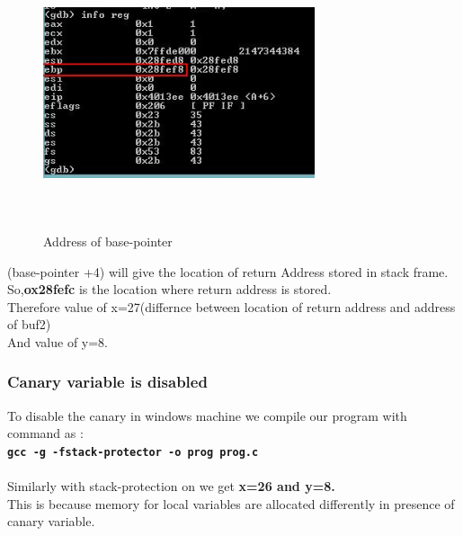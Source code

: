 \documentclass{article}
\begin{document}
      \begin{figure}[H]
           \begin{center}
		\includegraphics[width=8cm,height=8cm]{infoReg.JPG}
	\caption{Address of base-pointer}
	\end{center}
	\end{figure}
     
     (base-pointer +4) will give the location of return Address stored in stack frame.\\
     So,\textbf{ox28fefc} is the location where return address is stored.\\
     Therefore value of x=27(differnce between location of return address and address of buf2)\\
     And value of y=8.\\
    
   \subsubsection{Canary variable is disabled}
   \indent To disable the canary in windows machine we compile our program with command as : \\
   \textbf{\tt gcc -g -fstack-protector -o prog prog.c}\\\\
   Similarly with stack-protection on we get \textbf{x=26 and y=8.}\\
   This is because memory for local variables are allocated differently in presence of canary variable.\\
    
\end{document}
